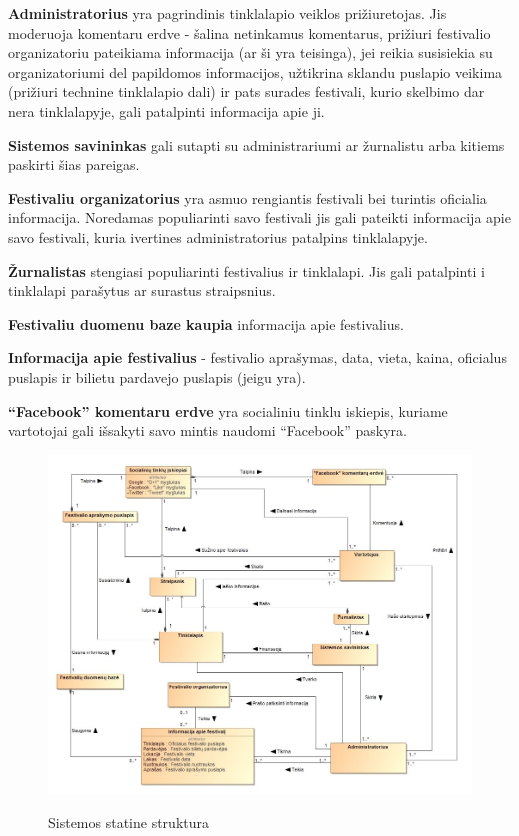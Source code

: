 ﻿\documentclass{VUMIFPSkursinis}
\begin{document}
\textbf{Administratorius} yra pagrindinis tinklalapio veiklos prižiuretojas.
Jis moderuoja komentaru erdve - šalina netinkamus komentarus, prižiuri festivalio organizatoriu pateikiama informacija (ar ši yra teisinga), jei reikia susisiekia su organizatoriumi del papildomos informacijos, užtikrina sklandu puslapio veikima (prižiuri technine tinklalapio dali) ir pats surades festivali, kurio skelbimo dar nera tinklalapyje, gali patalpinti informacija apie ji.

\textbf{Sistemos savininkas} gali sutapti su administrariumi ar žurnalistu arba kitiems paskirti šias pareigas.

\textbf{Festivaliu organizatorius} yra asmuo rengiantis festivali bei turintis oficialia informacija. Noredamas populiarinti savo festivali jis gali pateikti informacija apie savo festivali, kuria ivertines administratorius patalpins tinklalapyje.

\textbf{Žurnalistas} stengiasi populiarinti festivalius ir tinklalapi. Jis gali patalpinti i tinklalapi parašytus ar surastus straipsnius.

\textbf{Festivaliu duomenu baze kaupia} informacija apie festivalius.

\textbf{Informacija apie festivalius} - festivalio aprašymas, data, vieta, kaina, oficialus puslapis ir bilietu pardavejo puslapis (jeigu yra).

\textbf{“Facebook” komentaru erdve} yra socialiniu tinklu iskiepis, kuriame vartotojai gali išsakyti savo mintis naudomi “Facebook” paskyra.

\begin{figure}[H]
    \centering
    \includegraphics[scale=0.45]{img/geri/Statine_struktura}
    \label{img:uml1}
	\caption{Sistemos statine struktura}
\end{figure}
\end{document}

